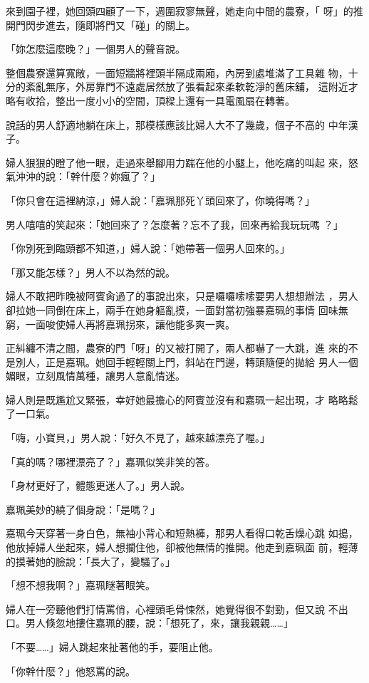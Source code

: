 來到園子裡，她回頭四顧了一下，週圍寂寥無聲，她走向中間的農寮，「
呀」的推開門閃步進去，隨即將門又「碰」的關上。

「妳怎麼這麼晚？」一個男人的聲音說。

整個農寮還算寬敞，一面短牆將裡頭半隔成兩廂，內房到處堆滿了工具雜
物，十分的紊亂無序，外房靠門不遠處居然放了張看起來柔軟乾淨的舊床舖，
這附近才略有收拾，整出一度小小的空間，頂樑上還有一具電風扇在轉著。

說話的男人舒適地躺在床上，那模樣應該比婦人大不了幾歲，個子不高的
中年漢子。

婦人狠狠的瞪了他一眼，走過來舉腳用力踹在他的小腿上，他吃痛的叫起
來，怒氣沖沖的說：「幹什麼？妳瘋了？」

「你只會在這裡納涼，」婦人說：「嘉珮那死丫頭回來了，你曉得嗎？」

男人嘻嘻的笑起來：「她回來了？怎麼著？忘不了我，回來再給我玩玩嗎
？」

「你別死到臨頭都不知道，」婦人說：「她帶著一個男人回來的。」

「那又能怎樣？」男人不以為然的說。

婦人不敢把昨晚被阿賓肏過了的事說出來，只是囉囉嗦嗦要男人想想辦法
，男人卻拉她一同倒在床上，兩手在她身軀亂摸，一面對當初強暴嘉珮的事情
回味無窮，一面唆使婦人再將嘉珮拐來，讓他能多爽一爽。

正糾纏不清之間，農寮的門「呀」的又被打開了，兩人都嚇了一大跳，進
來的不是別人，正是嘉珮。她回手輕輕關上門，斜站在門邊，轉頭隨便的拋給
男人一個媚眼，立刻風情萬種，讓男人意亂情迷。

婦人則是既尷尬又緊張，幸好她最擔心的阿賓並沒有和嘉珮一起出現，才
略略鬆了一口氣。

「嗨，小寶貝，」男人說：「好久不見了，越來越漂亮了喔。」

「真的嗎？哪裡漂亮了？」嘉珮似笑非笑的答。

「身材更好了，體態更迷人了。」男人說。

嘉珮美妙的繞了個身說：「是嗎？」

嘉珮今天穿著一身白色，無袖小背心和短熱褲，那男人看得口乾舌燥心跳
如搗，他放掉婦人坐起來，婦人想攔住他，卻被他無情的推開。他走到嘉珮面
前，輕薄的摸著她的臉說：「長大了，變騷了。」

「想不想我啊？」嘉珮瞇著眼笑。

婦人在一旁聽他們打情罵俏，心裡頭毛骨悚然，她覺得很不對勁，但又說
不出口。男人倏忽地摟住嘉珮的腰，說：「想死了，來，讓我親親……」

「不要……」婦人跳起來扯著他的手，要阻止他。

「你幹什麼？」他怒罵的說。


